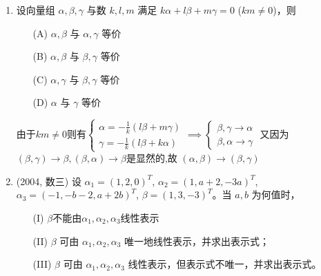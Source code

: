 \documentclass[12pt, a4paper, oneside, UTF8]{ctexbook}
\begin{document}
\begin{enumerate}
    \item 设向量组 $\alpha, \beta, \gamma$ 与数 $k, l, m$ 满足 $k\alpha + l\beta + m\gamma = 0$ ($km \neq 0$)，则
    \begin{enumerate}
        \item [(A)] $\alpha, \beta$ 与 $\alpha, \gamma$ 等价
        \item [(B)] $\alpha, \beta$ 与 $\beta, \gamma$ 等价
        \item [(C)] $\alpha, \gamma$ 与 $\beta, \gamma$ 等价
        \item [(D)] $\alpha$ 与 $\gamma$ 等价
    \end{enumerate}
    
    \begin{solution}
    由于$km\neq 0$则有$\begin{cases}
        \alpha = -\frac{1}{k}\left(l\beta+m\gamma\right) \\
        \gamma = -\frac{1}{k}\left(l\beta+k\alpha\right) 
    \end{cases} \implies \begin{cases}
        \beta,\gamma \rightarrow \alpha \\
        \beta,\alpha \rightarrow \gamma 
    \end{cases}$
    又因为$(\beta,\gamma) \rightarrow \beta,(\beta,\alpha) \rightarrow \beta $是显然的,故
    $(\alpha,\beta)\rightarrow(\beta,\gamma)$
    \end{solution}
    
    \item (2004, 数三) 设 $\alpha_1 = (1,2,0)^T$, $\alpha_2 = (1, a+2, -3a)^T$, $\alpha_3 = (-1, -b-2, a+2b)^T$,
    $\beta = (1,3,-3)^T$。当 $a, b$ 为何值时，
    \begin{enumerate}
        \item [(I)] $\beta$不能由$\alpha_1, \alpha_2, \alpha_3$线性表示
        \item [(II)] $\beta$ 可由 $\alpha_1, \alpha_2, \alpha_3$ 唯一地线性表示，并求出表示式；
        \item [(III)] $\beta$ 可由 $\alpha_1, \alpha_2, \alpha_3$ 线性表示，但表示式不唯一，并求出表示式。
    \end{enumerate}
    

\end{enumerate}
\end{document}
